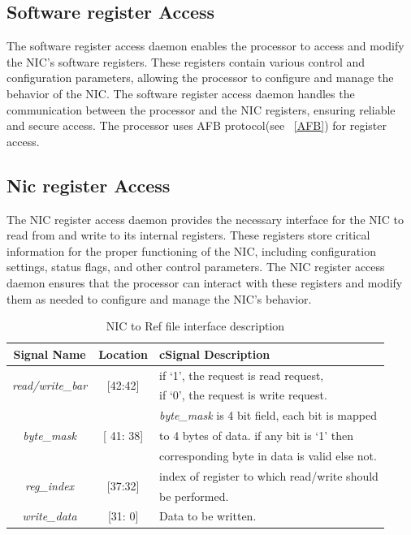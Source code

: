 \documentclass[12pt]{report}
\begin{document}
		\subsection{Software register Access}
				The software register access daemon enables the processor to access and modify the NIC's software registers. These registers contain various control and configuration parameters, allowing the processor to configure and manage the behavior of the NIC. The software register access daemon handles the communication between the processor and the NIC registers, ensuring reliable and secure access. The processor uses AFB protocol(see ~\ref{AFB}) for register access.\\

	

		\subsection{Nic register Access}
				The NIC register access daemon provides the necessary interface for the NIC to read from and write to its internal registers. These registers store critical information for the proper functioning of the NIC, including configuration settings, status flags, and other control parameters. The NIC register access daemon ensures that the processor can interact with these registers and modify them as needed to configure and manage the NIC's behavior.\\
		\begin{table}[!htbp]
					\centering
					\begin{tabular}{ccl}
						\hline
						\textbf{Signal Name} 			& \textbf{Location} 		&{c}\textbf{Signal Description}  \\ \hline
						\multirow{2}{*}{\textit{read/write\_bar}}& \multirow{2}{*}{[42:42]}	& if `1', the request is read request,\\ 
											& 				& if `0', the request is write request.\\ \hline
						\multirow{3}{*}{\textit{byte\_mask}}	& \multirow{3}{*}{[ 41: 38]}	& \textit{byte\_mask} is 4 bit field, each bit is mapped\\
											&				& to 4 bytes of data. if any bit is `1' then\\
											& 				& corresponding byte in data is valid else not.\\ \hline 
						\multirow{2}{*}{\textit{reg\_index}}   	& \multirow{2}{*}{[37:32]} 	& index of register to which read/write should\\ 
											&				& be performed.\\ \hline
						\textit{write\_data}   			& [31: 0] 			& Data to be written.\\ \hline
					\end{tabular}
					\caption{NIC to Ref file interface description}
					\label{tab:NIC-Reg-interface-req}
				\end{table}
\end{document}
